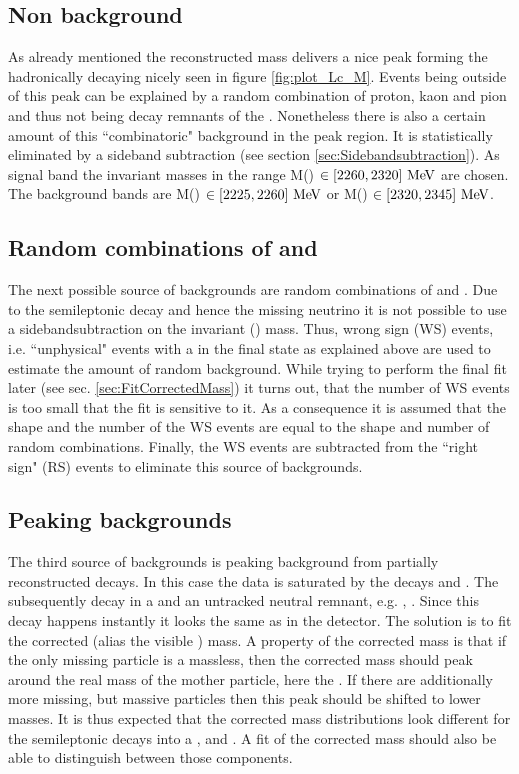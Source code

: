 \subsection{Non \Lc background}
As already mentioned the reconstructed \pKpi mass delivers a nice peak forming the hadronically decaying \Lc nicely seen in figure \ref{fig:plot_Lc_M}. 
Events being outside of this peak can be explained by a random combination of proton, kaon and pion and thus not being decay remnants of the \Lc.
Nonetheless there is also a certain amount of this ``combinatoric" background in the peak region.
It is statistically eliminated by a sideband subtraction (see section \ref{sec:Sidebandsubtraction}).
As signal band the invariant \pKpi masses in the range M(\pKpi) $\in \left[2260, 2320\right]\mathrm{\,Me\kern -0.1em V}$ are chosen.
The background bands are M(\pKpi) $\in \left[2225, 2260\right]\mathrm{\,Me\kern -0.1em V}$ or M(\pKpi) $\in \left[2320, 2345\right]\mathrm{\,Me\kern -0.1em V}$.

\subsection{Random combinations of \Lc and \mun}
The next possible source of backgrounds are random combinations of \Lc and \mun. 
Due to the semileptonic decay \LbToLcmunu and hence the missing neutrino \neumb it is not possible to use a sidebandsubtraction on the invariant \pKpi\mun (\Lc\mun) mass.
Thus, wrong sign (WS) events, i.e. ``unphysical" events with a \Lc\mup in the final state as explained above are used to estimate the amount of random \Lc\mun background.
While trying to perform the final fit later (see sec. \ref{sec:FitCorrectedMass}) it turns out, that the number of WS events is too small that the fit is sensitive to it.
As a consequence it is assumed that the shape and the number of the WS events are equal to the shape and number of random \Lc\mun combinations.
Finally, the WS events are subtracted from the ``right sign" (RS) events to eliminate this source of backgrounds.

\subsection{Peaking backgrounds}
The third source of backgrounds is peaking background from partially reconstructed decays. 
In this case the data is saturated by the decays  and  \cite{SL_Vub}.
The \Lcstar subsequently decay in a \Lc and an untracked neutral remnant, e.g. \piz, \pip\pim.
Since this decay happens instantly it looks the same as \LcTopKpi in the detector.
The solution is to fit the corrected \pKpi\mun (alias the visible \Lb) mass. 
A property of the corrected mass is that if the only missing particle is a massless, then the corrected mass should peak around the real mass of the mother particle, here the \Lb.
If there are additionally more missing, but massive particles then this peak should be shifted to lower masses.
It is thus expected that the corrected \pKpi\mun mass distributions look different for the semileptonic \Lb decays into a \Lc,  and .
A fit of the corrected mass should also be able to distinguish between those components.

